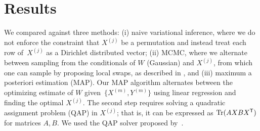 \documentclass{article}
\begin{document}
\section{Results}
\label{sec:results}

We compared against three methods: (i) naive
variational inference, where we do not enforce the constraint that
$X^{(j)}$ be a permutation and instead treat each row of~$X^{(j)}$ as
a Dirichlet distributed vector; (ii) MCMC, where we alternate between
sampling from the conditionals of $W$ (Gaussian) and ${X^{(j)}}$, from
which one can sample by proposing local swaps, as described in
\cite{Diaconis2009}, and (iii) maximum a posteriori estimation (MAP).
Our MAP algorithm alternates between the optimizing estimate of $W$ given~$\{X^{(m)}, Y^{(m)}\}$ using linear regression and finding the optimal ${X^{(j)}}$. The second step requires solving a quadratic assignment
problem (QAP) in ${X^{(j)}}$; that is, it can be expressed as
$\mathrm{Tr}(AXBX^{\mathsf{T}})$ for matrices $A,B$. We used the QAP solver
proposed by~\citet{Vogelstein2015}.
\end{document}
